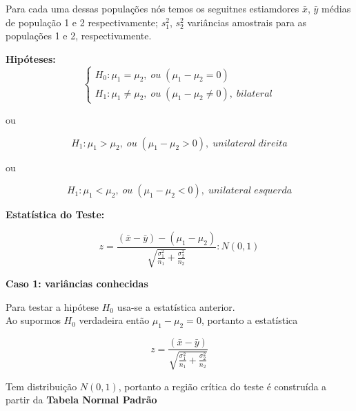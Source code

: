 \documentclass[
]{book}
\begin{document}
Para cada uma dessas populações nós temos os seguitnes estiamdores \(\bar{x}\), \(\bar{y}\) médias de população 1 e 2 respectivamente; \(s^2_1\), \(s^2_2\) variâncias amostrais para as populações 1 e 2, respectivamente.

\textbf{Hipóteses:}
\[
\begin{cases} H_0:\mu_1=\mu_2, \; ou\;(\mu_1-\mu_2 = 0) \\ 
H_1: \mu_1\neq\mu_2, \; ou\;(\mu_1-\mu_2 \neq 0),\; bilateral
\end{cases}
\]

ou

\[
H_1: \mu_1 >\mu_2, \; ou\;(\mu_1-\mu_2 > 0),\; unilateral \; direita
\]

ou

\[
H_1: \mu_1 < \mu_2, \; ou\;(\mu_1-\mu_2 < 0),\; unilateral\; esquerda 
\]

\textbf{Estatística do Teste:}

\[
z = \frac{(\bar{x}-\bar{y})-(\mu_1-\mu_2)}{\sqrt{\frac{\sigma^2_1}{n_1}+\frac{\sigma^2_2}{n_2}}}: N(0,1)
\]

\textbf{Caso 1: variâncias conhecidas}

Para testar a hipótese \(H_0\) usa-se a estatística anterior.\\
Ao supormos \(H_0\) verdadeira então \(\mu_1-\mu_2 = 0\), portanto a estatística

\[
z = \frac{(\bar{x}-\bar{y})}{\sqrt{\frac{\sigma^2_1}{n_1}+\frac{\sigma^2_2}{n_2}}}
\]

Tem distribuição \(N(0,1)\), portanto a região crítica do teste é construída a partir da \textbf{Tabela Normal Padrão}
\end{document}
